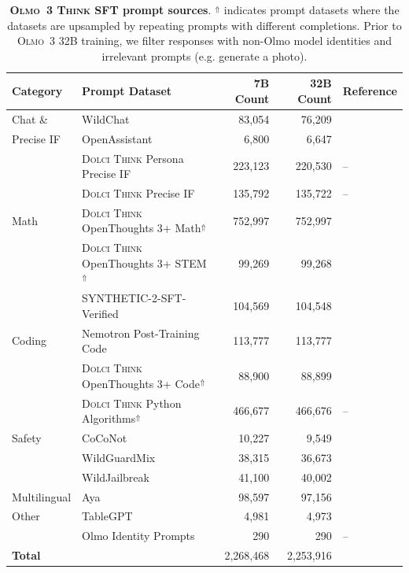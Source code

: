 \documentclass[table]{ai2style/ai2}
\newcommand{\newOlmo}{Olmo\xspace}
\newcommand{\olmothree}{\textsc{\newOlmo~3}\xspace}
\newcommand{\olmothreethinking}{\textsc{Olmo~3 Think}\xspace}
\newcommand{\dolcithink}{\textsc{Dolci Think}\xspace}
\begin{document}
\begin{table}[t!]
\centering
\setlength\tabcolsep{5pt}
{\small
\begin{tabular}{ll r r l}
\toprule
{\bf Category} & {\bf Prompt Dataset}  & {\bf 7B Count} & {\bf 32B Count} & {\bf Reference} \\
\midrule
\rowcolor{ai2offwhite} Chat \&  & WildChat & 83,054 & 76,209 & \citet{zhao2024wildchat} \\ 
\rowcolor{ai2offwhite} Precise IF & OpenAssistant & 6,800 & 6,647 & \citet{kopf2024openassistant} \\ 
\rowcolor{ai2offwhite} & \dolcithink Persona Precise IF & 223,123 & 220,530 & -- \\ 
\rowcolor{ai2offwhite}  & \dolcithink Precise IF & 135,792 & 135,722 & -- \\ 
Math & \dolcithink OpenThoughts 3+ Math$^\Uparrow$ & 752,997 & 752,997 & \citet{guha2025openthoughts} \\
 & \dolcithink OpenThoughts 3+ STEM$^\Uparrow$ & 99,269 & 99,268 & \citet{guha2025openthoughts} \\ 
 & SYNTHETIC-2-SFT-Verified & 104,569 & 104,548 & \citet{primeintellect2025synthetic2} \\ 
\rowcolor{ai2offwhite} Coding & Nemotron Post-Training Code   & 113,777 & 113,777 & \citet{nvidia2025nemotron_post_training_dataset} \\ 
 \rowcolor{ai2offwhite}  & \dolcithink OpenThoughts 3+ Code$^\Uparrow$ & 88,900 & 88,899 & \citet{guha2025openthoughts} \\ 
\rowcolor{ai2offwhite}  & \dolcithink Python Algorithms$^\Uparrow$ & 466,677 & 466,676 & -- \\ 
Safety & CoCoNot & 10,227 & 9,549 & \citet{brahman2024art} \\ 
 & WildGuardMix & 38,315 & 36,673 & \citet{han2024wildguard} \\ 
 & WildJailbreak & 41,100 & 40,002 & \citet{jiang2024wildteaming} \\ 
\rowcolor{ai2offwhite} Multilingual & Aya & 98,597 & 97,156 & \citet{singh2024aya} \\ 
Other & TableGPT & 4,981 & 4,973 & \citet{zha2023tablegpt} \\ 
& Olmo Identity Prompts & 290 & 290 & -- \\ 
\rowcolor{ai2offwhite} {\bf{Total}} & & 2,268,468 & 2,253,916 & \\
\bottomrule
\end{tabular}}
\vspace{3pt}
\caption{\textbf{\olmothreethinking SFT prompt sources}. 
$^\Uparrow$ indicates prompt datasets where the datasets are upsampled by repeating prompts with different completions. 
Prior to \olmothree 32B training, we filter responses with non-Olmo model identities and irrelevant prompts (e.g. generate a photo).
}
\label{tab:olmo3_thinking_sft}
\end{table}
\end{document}

